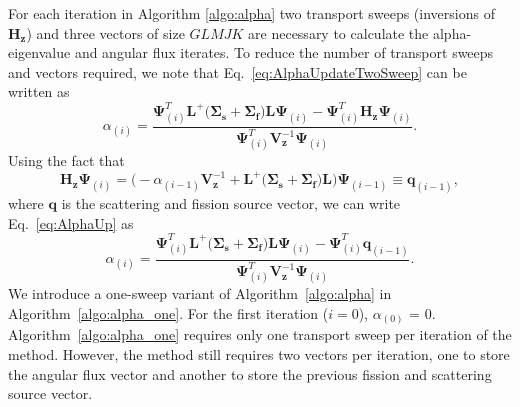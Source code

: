 For each iteration in Algorithm \ref{algo:alpha} two transport sweeps (inversions of $\mathbf{H_{z}}$) and three vectors of size $GLMJK$ are necessary to calculate the alpha-eigenvalue and angular flux iterates. To reduce the number of transport sweeps and vectors required, we note that Eq.~\ref{eq:AlphaUpdateTwoSweep} can be written as
\begin{equation}
	\alpha_{(i)} = \frac{ \mathbf{\Psi}^{T}_{(i)} \mathbf{L}^{+} \big ( \mathbf{\Sigma_{s}} + \mathbf{\Sigma_{f}} \big ) \mathbf{L} \mathbf{\Psi}_{(i)} -  \mathbf{\Psi}^{T}_{(i)}  \mathbf{H_{z}} \mathbf{\Psi}_{(i)}}{  \mathbf{\Psi}^{T}_{(i)} \mathbf{V}^{-1}_{\mathbf{z}}  \mathbf{\Psi}_{(i)}}.
	\label{eq:AlphaUp}
\end{equation}
Using the fact that 
\begin{equation}
\mathbf{H_{z}} \mathbf{\Psi}_{(i)} =  \bigg ( -\alpha_{(i-1)} \mathbf{V}_{\mathbf{z}}^{-1} + \mathbf{L}^{+} \big ( \mathbf{\Sigma_{s}} + \mathbf{\Sigma_{f}} \big ) \mathbf{L} \bigg ) \mathbf{\Psi}_{(i-1)} \equiv \mathbf{q}_{(i-1)},
\end{equation}
where $\mathbf{q}$ is the scattering and fission source vector, we can write Eq.~\ref{eq:AlphaUp} as
\begin{equation}
	\alpha_{(i)} = \frac{ \mathbf{\Psi}^{T}_{(i)} \mathbf{L}^{+} \big ( \mathbf{\Sigma_{s}} + \mathbf{\Sigma_{f}} \big ) \mathbf{L} \mathbf{\Psi}_{(i)} -  \mathbf{\Psi}^{T}_{(i)}  \mathbf{q}_{(i-1)}}{  \mathbf{\Psi}^{T}_{(i)} \mathbf{V}^{-1}_{\mathbf{z}}  \mathbf{\Psi}_{(i)}}.
\end{equation}
We introduce a one-sweep variant of Algorithm~\ref{algo:alpha} in Algorithm~\ref{algo:alpha_one}. For the first iteration ($i=0$), $\alpha_{(0)}$ = 0. Algorithm~\ref{algo:alpha_one} requires only one transport sweep per iteration of the method. However, the method still requires two vectors per iteration, one to store the angular flux vector and another to store the previous fission and scattering source vector.
